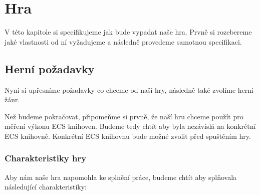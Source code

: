 \chapter{Hra}
V této kapitole si specifikujeme jak bude vypadat naše hra. Prvně si rozebereme jaké vlastnosti od ní vyžadujeme a následně provedeme samotnou specifikaci.

\section{Herní požadavky}
Nyní si upřesníme požadavky co chceme od naší hry, následně také zvolíme herní žánr.

Než budeme pokračovat, připomeňme si prvně, že naší hru chceme použít pro měření výkonu ECS knihoven. Budeme tedy chtít aby byla nezávislá na konkrétní ECS knihovně. Konkrétní ECS knihovnu bude možné zvolit před spuštěním hry.

\subsection{Charakteristiky hry}
Aby nám naše hra napomohla ke splnění práce, budeme chtít aby splňovala následující charakteristiky:

